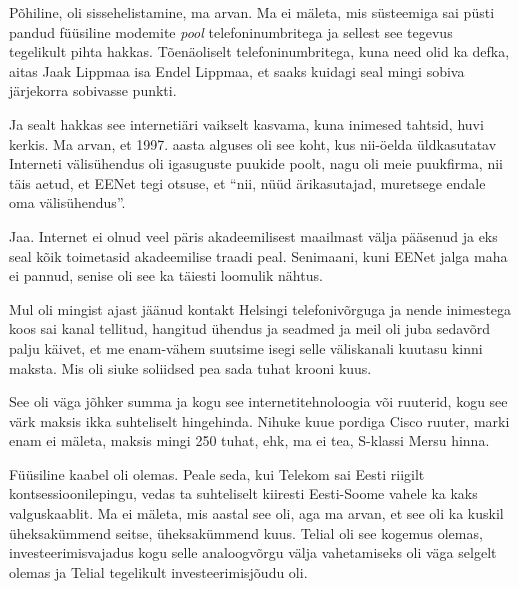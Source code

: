 Põhiline, oli sissehelistamine, ma arvan. Ma ei mäleta, mis süsteemiga sai 
püsti pandud füüsiline modemite \emph{pool} telefoninumbritega  ja sellest see 
tegevus tegelikult pihta hakkas. Tõenäoliselt telefoninumbritega, kuna need 
olid ka defka, aitas Jaak Lippmaa isa Endel 
Lippmaa, et saaks kuidagi seal mingi sobiva 
järjekorra sobivasse punkti.

Ja sealt  hakkas see internetiäri vaikselt kasvama, kuna inimesed tahtsid, huvi 
kerkis. Ma arvan, et 1997.  aasta alguses oli see koht, kus  nii-öelda 
üldkasutatav Interneti välisühendus oli igasuguste puukide poolt, nagu oli meie 
puukfirma, nii täis aetud, et EENet tegi otsuse, et \enquote{nii, 
nüüd ärikasutajad, muretsege endale oma välisühendus}.


Jaa. Internet ei olnud veel päris akadeemilisest maailmast välja pääsenud ja 
eks seal kõik toimetasid akadeemilise traadi peal. Senimaani, kuni EENet jalga 
maha ei pannud, senise oli see ka täiesti  loomulik nähtus. 


Mul oli mingist ajast jäänud kontakt Helsingi telefonivõrguga ja nende 
inimestega koos sai  kanal tellitud, hangitud ühendus ja seadmed ja meil oli 
juba  sedavõrd palju käivet, et me enam-vähem suutsime isegi selle väliskanali 
kuutasu kinni maksta. Mis oli siuke soliidsed pea sada tuhat krooni kuus. 


See oli väga jõhker summa ja kogu see internetitehnoloogia või 
ruuterid,  kogu see värk maksis ikka suhteliselt hingehinda. Nihuke kuue 
pordiga Cisco ruuter, marki enam ei mäleta,  maksis mingi 250 tuhat, ehk, ma ei 
tea, S-klassi Mersu hinna.


Füüsiline kaabel oli olemas. Peale seda, kui Telekom sai 
Eesti riigilt kontsessioonilepingu,  vedas ta suhteliselt kiiresti Eesti-Soome 
vahele ka kaks valguskaablit. Ma ei mäleta, mis aastal see oli, aga ma arvan, 
et see oli ka kuskil üheksakümmend seitse, üheksakümmend kuus. 
Telial oli see kogemus olemas, investeerimisvajadus kogu selle 
analoogvõrgu välja vahetamiseks oli väga selgelt olemas ja Telial tegelikult 
investeerimisjõudu oli. 

